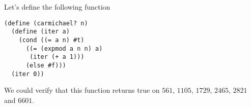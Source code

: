 \documentclass[a4paper,12pt]{article}
\begin{document}
Let's define the following function
\begin{lstlisting}
(define (carmichael? n)
  (define (iter a)
    (cond ((= a n) #t)
	  ((= (expmod a n n) a)
	   (iter (+ a 1)))
	  (else #f)))
  (iter 0))
\end{lstlisting}
We could verify that this function returns true on $561$, $1105$,
$1729$, $2465$, $2821$ and $6601$.
\end{document}
